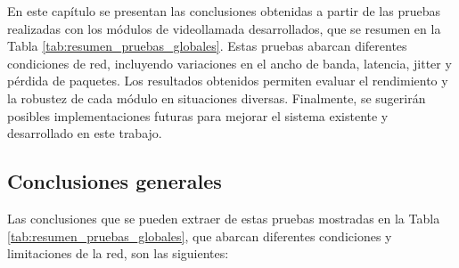 \label{sec:conclusion}
En este capítulo se presentan las conclusiones obtenidas a partir de las pruebas realizadas con los módulos de videollamada desarrollados, que se resumen en la Tabla \ref{tab:resumen_pruebas_globales}. Estas pruebas abarcan diferentes condiciones de red, incluyendo variaciones en el ancho de banda, latencia, jitter y pérdida de paquetes. Los resultados obtenidos permiten evaluar el rendimiento y la robustez de cada módulo en situaciones diversas. Finalmente, se sugerirán posibles implementaciones futuras para mejorar el sistema existente y desarrollado en este trabajo.
\subsection{Conclusiones generales}
Las conclusiones que se pueden extraer de estas pruebas mostradas en la Tabla \ref{tab:resumen_pruebas_globales}, que abarcan diferentes condiciones y limitaciones de la red, son las siguientes:

